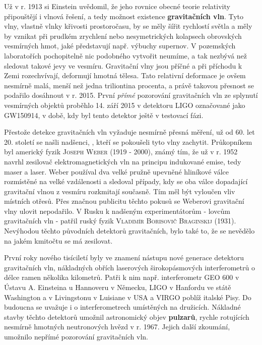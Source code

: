         Už v r. 1913 si Einstein uvědomil, že jeho rovnice obecné teorie relativity připouštějí i
        vlnová řešení, a tedy možnost existence \textbf{gravitačních vln}. Tyto vlny, vlastně vlnky
        křivosti prostoročasu, by se měly šířit rychlostí světla a měly by vznikat při prudkém
        zrychlení nebo nesymetrických kolapsech obrovských vesmírných hmot, jaké představují např.
        výbuchy supernov. V pozemských laboratořích pochopitelně nic podobného vytvořit neumíme, a
        tak nezbývá než sledovat takové jevy ve vesmíru. Gravitační vlny jsou příčné a při příchodu
        k Zemi rozechvívají, deformují hmotná tělesa. Tato relativní deformace je ovšem nesmírně
        malá, menší než jedna triliontina procenta, a právě takovou přesnost se podařilo dosáhnout v
        r. 2015. První \emph{přímé} pozorování gravitačních vln ze splynutí vesmírných objektů
        proběhlo 14. září 2015 v detektoru LIGO označované jako GW150914, v době, kdy byl tento
        detektor ještě v testovací fázi. 

        Přestože detekce gravitačních vln vyžaduje nesmírně přesná měření, už od 60. let 20. století
        se našli nadšenci, \emph{}, kteří se pokoušeli tyto vlny
        zachytit. Průkopníkem byl americký fyzik \textsc{Joseph Weber} (1919 - 2000), známý tím, že
        už v r. 1952 navrhl zesilovač elektromagnetických vln na principu indukované emise, tedy
        maser a laser. Weber používal dva velké pružně upevněné hliníkové válce rozmístěné na velké
        vzdálenosti a sledoval případy, kdy se oba válce dopadající gravitační vlnou z vesmíru
        rozkmitají současně. Tím měl být vyloučen vliv místních otřesů. Přes značnou publicitu
        těchto pokusů se Weberovi gravitační vlny ulovit nepodařilo. V Rusku k nadšeným
        experimentátorům - lovcům gravitačních vln - patřil ruský fyzik \textsc{Vladimír Borisovič
        Braginskij} (1931). Nevýhodou těchto původních detektorů gravitačních, bylo také to, že se
        nevědělo na jakém kmitočtu se má zesilovat.

        První roky nového tisíciletí byly ve znamení nástupu nové generace detektoru gravitačních
        vln, nákladných obřích laserových širokopásmových interferometrů o délce ramen několika
        kilometrů. Patři k nim např. interferometr GEO 600 v Ústavu A. Einsteina u Hannoveru v
        Německu, LIGO v Hanfordu ve státě Washington a v Livingstonu v Luisiane v USA a VIRGO poblíž
        italské Pisy. Do budoucna se uvažuje i o interferometrech umístěných na družicích. Nákladné
        stavby těchto detektorů umožnil astronomický objev \textbf{pulzarů}, rychle rotujících
        nesmírně hmotných neutronových hvězd v r. 1967. Jejich další zkoumání, umožnilo nepřímé
        pozorování gravitačních vln. 

